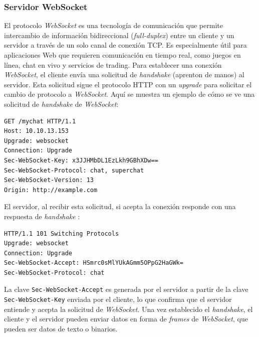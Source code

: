 \subsubsection{Servidor WebSocket}\label{sec:serverWebSocket}
 
El protocolo \textit{WebSocket} es una tecnología de comunicación que permite intercambio de información bidireccional (\textit{full-duplex}) entre un cliente y un servidor a través de un solo canal de conexión TCP. Es especialmente útil para aplicaciones Web que requieren comunicación en tiempo real, como juegos en línea, chat en vivo y servicios de trading. Para establecer una conexión \textit{WebSocket}, el cliente envía una solicitud de  \textit{handshake} (aprenton de manos) al servidor. Esta solicitud sigue el protocolo HTTP con un \textit{upgrade} para solicitar el cambio de protocolo a \textit{WebSocket}. Aquí se muestra un ejemplo de cómo se ve una solicitud de \textit{handshake} de \textit{WebSocket}:

\begin{verbatim}
GET /mychat HTTP/1.1
Host: 10.10.13.153
Upgrade: websocket
Connection: Upgrade
Sec-WebSocket-Key: x3JJHMbDL1EzLkh9GBhXDw==
Sec-WebSocket-Protocol: chat, superchat
Sec-WebSocket-Version: 13
Origin: http://example.com
\end{verbatim}

El servidor, al recibir esta solicitud, si acepta la conexión responde con una respuesta de \textit{handshake} :

\begin{verbatim}
HTTP/1.1 101 Switching Protocols
Upgrade: websocket
Connection: Upgrade
Sec-WebSocket-Accept: HSmrc0sMlYUkAGmm5OPpG2HaGWk=
Sec-WebSocket-Protocol: chat
\end{verbatim}

La clave \texttt{Sec-WebSocket-Accept} es generada por el servidor a partir de la clave \texttt{Sec-WebSocket-Key} enviada por el cliente, lo que confirma que el servidor entiende y acepta la solicitud de \textit{WebSocket}. Una vez establecido el \textit{handshake}, el cliente y el servidor pueden enviar datos en forma de \textit{frames} de \textit{WebSocket}, que pueden ser datos de texto o binarios. 

